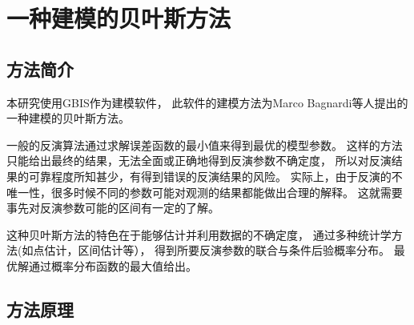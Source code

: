 \chapter{一种建模的贝叶斯方法}

\section{方法简介}
本研究使用GBIS作为建模软件，
此软件的建模方法为Marco Bagnardi等人提出的一种建模的贝叶斯方法。

一般的反演算法通过求解误差函数的最小值来得到最优的模型参数。
这样的方法只能给出最终的结果，无法全面或正确地得到反演参数不确定度，
所以对反演结果的可靠程度所知甚少，有得到错误的反演结果的风险。
实际上，由于反演的不唯一性，很多时候不同的参数可能对观测的结果都能做出合理的解释。
这就需要事先对反演参数可能的区间有一定的了解。

这种贝叶斯方法的特色在于能够估计并利用数据的不确定度，
通过多种统计学方法(如点估计，区间估计等），
得到所要反演参数的联合与条件后验概率分布。
最优解通过概率分布函数的最大值给出。

\section{方法原理}

